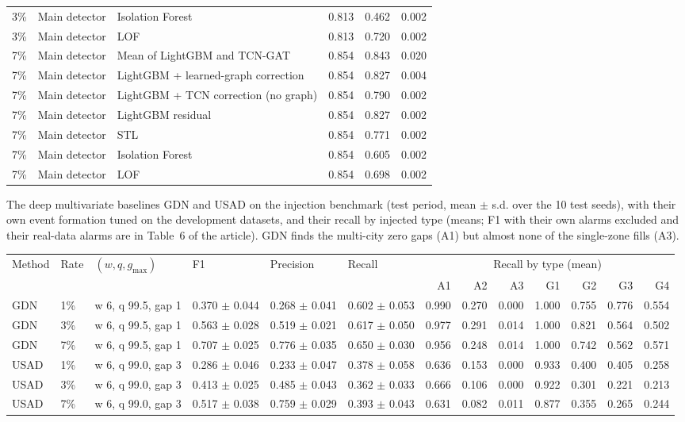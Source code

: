 \documentclass[11pt,a4paper]{article}
\makeatletter
\newenvironment{stable}{\par\addvspace{8pt}\noindent\begin{minipage}{\textwidth}\def\@captype{table}\centering}{\end{minipage}\par\addvspace{8pt}}
\makeatother
\begin{document}
\begin{longtable}{@{}l l l r r r@{}}
3\% & Main detector & Isolation Forest & 0.813 & 0.462 & 0.002 \\
3\% & Main detector & LOF & 0.813 & 0.720 & 0.002 \\
7\% & Main detector & Mean of LightGBM and TCN-GAT & 0.854 & 0.843 & 0.020 \\
7\% & Main detector & LightGBM + learned-graph correction & 0.854 & 0.827 & 0.004 \\
7\% & Main detector & LightGBM + TCN correction (no graph) & 0.854 & 0.790 & 0.002 \\
7\% & Main detector & LightGBM residual & 0.854 & 0.827 & 0.002 \\
7\% & Main detector & STL & 0.854 & 0.771 & 0.002 \\
7\% & Main detector & Isolation Forest & 0.854 & 0.605 & 0.002 \\
7\% & Main detector & LOF & 0.854 & 0.698 & 0.002 \\
\end{longtable}
\endgroup

\begin{stable}
\caption{The deep multivariate baselines GDN and USAD on the injection benchmark (test period, mean $\pm$ s.d. over the 10 test seeds), with their own event formation tuned on the development datasets, and their recall by injected type (means; F1 with their own alarms excluded and their real-data alarms are in Table~6 of the article). GDN finds the multi-city zero gaps (A1) but almost none of the single-zone fills (A3).}\label{tab:s-deep}
\scriptsize\setlength{\tabcolsep}{2pt}
\begin{tabular}{@{}l l l l l l rrrrrrr@{}}
\toprule
Method & Rate & $(w, q, g_{\max})$ & F1 & Precision & Recall & \multicolumn{7}{c}{Recall by type (mean)} \\
\cmidrule(l){7-13}
 & & & & & & A1 & A2 & A3 & G1 & G2 & G3 & G4 \\
\midrule
GDN & 1\% & w 6, q 99.5, gap 1 & 0.370 $\pm$ 0.044 & 0.268 $\pm$ 0.041 & 0.602 $\pm$ 0.053 & 0.990 & 0.270 & 0.000 & 1.000 & 0.755 & 0.776 & 0.554 \\
GDN & 3\% & w 6, q 99.5, gap 1 & 0.563 $\pm$ 0.028 & 0.519 $\pm$ 0.021 & 0.617 $\pm$ 0.050 & 0.977 & 0.291 & 0.014 & 1.000 & 0.821 & 0.564 & 0.502 \\
GDN & 7\% & w 6, q 99.5, gap 1 & 0.707 $\pm$ 0.025 & 0.776 $\pm$ 0.035 & 0.650 $\pm$ 0.030 & 0.956 & 0.248 & 0.014 & 1.000 & 0.742 & 0.562 & 0.571 \\
\midrule
USAD & 1\% & w 6, q 99.0, gap 3 & 0.286 $\pm$ 0.046 & 0.233 $\pm$ 0.047 & 0.378 $\pm$ 0.058 & 0.636 & 0.153 & 0.000 & 0.933 & 0.400 & 0.405 & 0.258 \\
USAD & 3\% & w 6, q 99.0, gap 3 & 0.413 $\pm$ 0.025 & 0.485 $\pm$ 0.043 & 0.362 $\pm$ 0.033 & 0.666 & 0.106 & 0.000 & 0.922 & 0.301 & 0.221 & 0.213 \\
USAD & 7\% & w 6, q 99.0, gap 3 & 0.517 $\pm$ 0.038 & 0.759 $\pm$ 0.029 & 0.393 $\pm$ 0.043 & 0.631 & 0.082 & 0.011 & 0.877 & 0.355 & 0.265 & 0.244 \\
\bottomrule
\end{tabular}
\end{stable}
\end{document}
